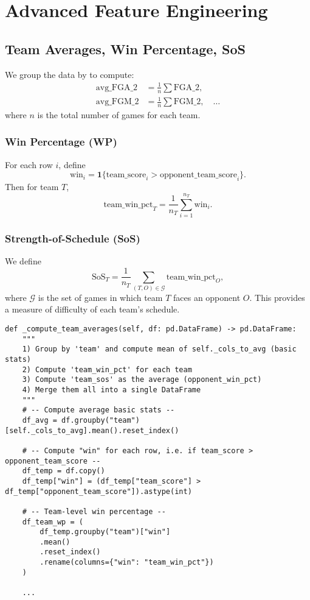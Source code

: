 \documentclass[12pt]{article}
\begin{document}
\section{Advanced Feature Engineering}

\subsection{Team Averages, Win Percentage, SoS}
We group the data by  to compute:
\begin{align*}
\text{avg\_FGA\_2} &= \frac{1}{n}\sum \text{FGA\_2}, \\
\text{avg\_FGM\_2} &= \frac{1}{n}\sum \text{FGM\_2}, \quad \ldots
\end{align*}
where \(n\) is the total number of games for each team.

\subsubsection{Win Percentage (WP)}
For each row \(i\), define
\[
\text{win}_i = \mathbf{1}\{ \text{team\_score}_i > \text{opponent\_team\_score}_i \}.
\]
Then for team \(T\),
\[
\text{team\_win\_pct}_T = \frac{1}{n_T} \sum_{i=1}^{n_T} \text{win}_i.
\]

\subsubsection{Strength-of-Schedule (SoS)}
We define
\[
\text{SoS}_T = \frac{1}{n_T} \sum_{(T, O) \in \mathcal{G}} \text{team\_win\_pct}_O,
\]
where \(\mathcal{G}\) is the set of games in which team \(T\) faces an opponent \(O\). This provides a measure of difficulty of each team’s schedule.

\begin{verbatim}
def _compute_team_averages(self, df: pd.DataFrame) -> pd.DataFrame:
    """
    1) Group by 'team' and compute mean of self._cols_to_avg (basic stats)
    2) Compute 'team_win_pct' for each team
    3) Compute 'team_sos' as the average (opponent_win_pct)
    4) Merge them all into a single DataFrame
    """
    # -- Compute average basic stats --
    df_avg = df.groupby("team")[self._cols_to_avg].mean().reset_index()

    # -- Compute "win" for each row, i.e. if team_score > opponent_team_score --
    df_temp = df.copy()
    df_temp["win"] = (df_temp["team_score"] > df_temp["opponent_team_score"]).astype(int)

    # -- Team-level win percentage --
    df_team_wp = (
        df_temp.groupby("team")["win"]
        .mean()
        .reset_index()
        .rename(columns={"win": "team_win_pct"})
    )

    ...
\end{verbatim}
\end{document}
